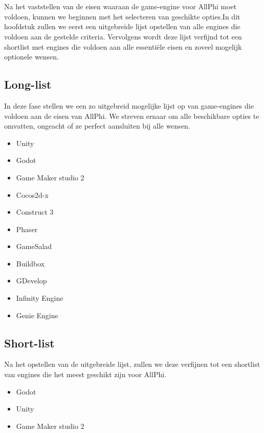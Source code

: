 
\chapter{}%
\label{ch:selectie-game-engines}

Na het vaststellen van de eisen waaraan de game-engine voor AllPhi moet voldoen, kunnen we beginnen met het selecteren van geschikte opties.In dit hoofdstuk zullen we eerst een uitgebreide lijst opstellen van alle engines die voldoen aan de gestelde criteria. Vervolgens wordt deze lijst verfijnd tot een shortlist met engines die voldoen aan alle essentiële eisen en zoveel mogelijk optionele wensen.

\section{Long-list}
In deze fase stellen we een zo uitgebreid mogelijke lijst op van game-engines die voldoen aan de eisen van AllPhi. We streven ernaar om alle beschikbare opties te omvatten, ongeacht of ze perfect aansluiten bij alle wensen.

\begin{itemize}
    \item Unity
    \item Godot
    \item Game Maker studio 2
    \item Cocos2d-x
    \item Construct 3
    \item Phaser
    \item GameSalad
    \item Buildbox
    \item GDevelop
    \item Infinity Engine
    \item Genie Engine
\end{itemize}

\section{Short-list}
Na het opstellen van de uitgebreide lijst, zullen we deze verfijnen tot een shortlist van engines die het meest geschikt zijn voor AllPhi.
\begin{itemize}
    \item Godot
    \item Unity
    \item Game Maker studio 2
\end{itemize}